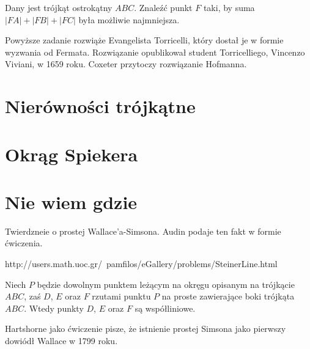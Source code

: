 \begin{problem}
	\label{punkt_fermata}
	Dany jest trójkąt ostrokątny $ABC$.
	Znaleźć punkt $F$ taki, by suma $|FA| + |FB| + |FC|$ była możliwie najmniejsza.
%
\end{problem}


Powyższe zadanie rozwiąże Evangelista Torricelli, który dostał je w formie wyzwania od Fermata.
%
Rozwiązanie opublikował student Torricelliego, Vincenzo Viviani, w 1659 roku.
Coxeter \cite[s. 37]{coxeter_1967} przytoczy rozwiązanie Hofmanna. %

\section{Nierówności trójkątne}


\section{Okrąg Spiekera}


\section{Nie wiem gdzie}


Twierdzneie o prostej Wallace'a-Simsona. %
Audin \cite[s. 104]{audin_2003} podaje ten fakt w formie ćwiczenia.

http://users.math.uoc.gr/~pamfilos/eGallery/problems/SteinerLine.html

\begin{proposition}
	Niech $P$ będzie dowolnym punktem leżącym na okręgu opisanym na trójkącie $ABC$, zaś $D$, $E$ oraz $F$ rzutami punktu $P$ na proste zawierające boki trójkąta $ABC$.
	Wtedy punkty $D$, $E$ oraz $F$ są współliniowe.
\end{proposition}

Hartshorne jako ćwiczenie \cite[s. 61]{hartshorne2000} pisze, że istnienie prostej Simsona jako pierwszy dowiódł Wallace w 1799 roku.

